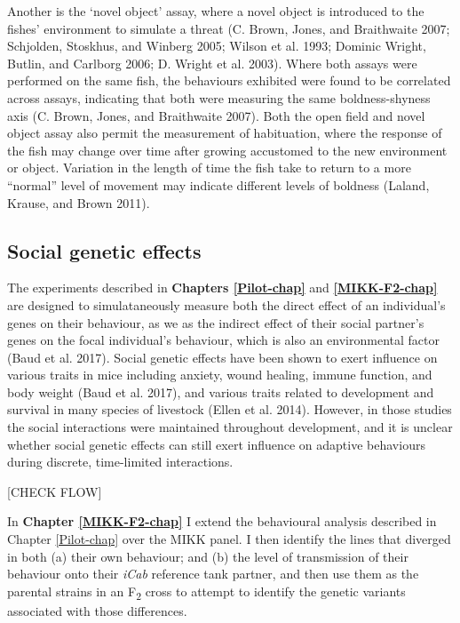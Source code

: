 \documentclass[
]{book}
\begin{document}
Another is the `novel object' assay, where a novel object is introduced to the fishes' environment to simulate a threat (C. Brown, Jones, and Braithwaite 2007; Schjolden, Stoskhus, and Winberg 2005; Wilson et al. 1993; Dominic Wright, Butlin, and Carlborg 2006; D. Wright et al. 2003). Where both assays were performed on the same fish, the behaviours exhibited were found to be correlated across assays, indicating that both were measuring the same boldness-shyness axis (C. Brown, Jones, and Braithwaite 2007). Both the open field and novel object assay also permit the measurement of habituation, where the response of the fish may change over time after growing accustomed to the new environment or object. Variation in the length of time the fish take to return to a more ``normal'' level of movement may indicate different levels of boldness (Laland, Krause, and Brown 2011).

\hypertarget{SGE}{%
\subsection{Social genetic effects}\label{SGE}}

The experiments described in \textbf{Chapters \ref{Pilot-chap}} and \textbf{\ref{MIKK-F2-chap}} are designed to simulataneously measure both the direct effect of an individual's genes on their behaviour, as we as the indirect effect of their social partner's genes on the focal individual's behaviour, which is also an environmental factor (Baud et al. 2017). Social genetic effects have been shown to exert influence on various traits in mice including anxiety, wound healing, immune function, and body weight (Baud et al. 2017), and various traits related to development and survival in many species of livestock (Ellen et al. 2014). However, in those studies the social interactions were maintained throughout development, and it is unclear whether social genetic effects can still exert influence on adaptive behaviours during discrete, time-limited interactions.

{[}CHECK FLOW{]}

In \textbf{Chapter \ref{MIKK-F2-chap}} I extend the behavioural analysis described in Chapter \ref{Pilot-chap} over the MIKK panel. I then identify the lines that diverged in both (a) their own behaviour; and (b) the level of transmission of their behaviour onto their \emph{\textcolor{iCab_424B4D}{iCab}} reference tank partner, and then use them as the parental strains in an F\textsubscript{2} cross to attempt to identify the genetic variants associated with those differences.
\end{document}
